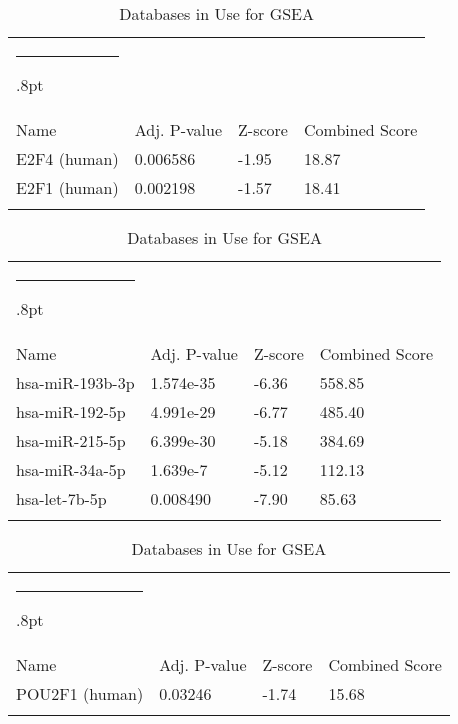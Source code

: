 \documentclass[3p,authoryear,preprint,12pt]{elsarticle}
\makeatletter
\def\hlinewd#1{%
  \noalign{\ifnum0=`}\fi\hrule \@height #1%
  \futurelet\reserved@a\@xhline}
\def\tbltoprule{\hlinewd{.8pt}\\[-12pt]}
\def\tblbottomrule{\noalign{\vspace*{6pt}}\hline\noalign{\vspace*{2pt}}}
\def\tblmidrule{\noalign{\vspace*{6pt}}\hline\noalign{\vspace*{2pt}}}
\makeatother
\begin{document}
\begin{table*}[!htbp]
	\caption{{Databases in Use for GSEA} }
	\label{tw-de478ae31cc6}
	\def\arraystretch{1}
	\ignorespaces 
	\centering 
	\begin{tabulary}{\linewidth}{p{\dimexpr.65\tabcolsep}p{\dimexpr.15\tabcolsep}p{\dimexpr.1\tabcolsep}p{\dimexpr.1\tabcolsep}}
		\tbltoprule Name & Adj. P-value & Z-score & Combined Score\\
		\tblmidrule
E2F4 (human) & 0.006586 & -1.95 & 18.87 \\
E2F1 (human) & 0.002198 & -1.57 & 18.41 \\
		\tblbottomrule
	\end{tabulary}\par 
\end{table*}
\begin{table*}[!htbp]
	\caption{{Databases in Use for GSEA} }
	\label{tw-de478ae31cc6}
	\def\arraystretch{1}
	\ignorespaces 
	\centering 
	\begin{tabulary}{\linewidth}{p{\dimexpr.65\tabcolsep}p{\dimexpr.15\tabcolsep}p{\dimexpr.1\tabcolsep}p{\dimexpr.1\tabcolsep}}
		\tbltoprule Name & Adj. P-value & Z-score & Combined Score\\
		\tblmidrule
hsa-miR-193b-3p & 1.574e-35 & -6.36 & 558.85 \\
hsa-miR-192-5p & 4.991e-29 & -6.77 & 485.40 \\
hsa-miR-215-5p & 6.399e-30 & -5.18 & 384.69 \\
hsa-miR-34a-5p & 1.639e-7 & -5.12 & 112.13 \\
hsa-let-7b-5p & 0.008490 & -7.90 & 85.63 \\
		\tblbottomrule
	\end{tabulary}\par 
\end{table*}
\begin{table*}[!htbp]
	\caption{{Databases in Use for GSEA} }
	\label{tw-de478ae31cc6}
	\def\arraystretch{1}
	\ignorespaces 
	\centering 
	\begin{tabulary}{\linewidth}{p{\dimexpr.65\tabcolsep}p{\dimexpr.15\tabcolsep}p{\dimexpr.1\tabcolsep}p{\dimexpr.1\tabcolsep}}
		\tbltoprule Name & Adj. P-value & Z-score & Combined Score\\
		\tblmidrule
POU2F1 (human) & 0.03246 & -1.74 & 15.68 \\
		\tblbottomrule
	\end{tabulary}\par 
\end{table*}
\end{document}
